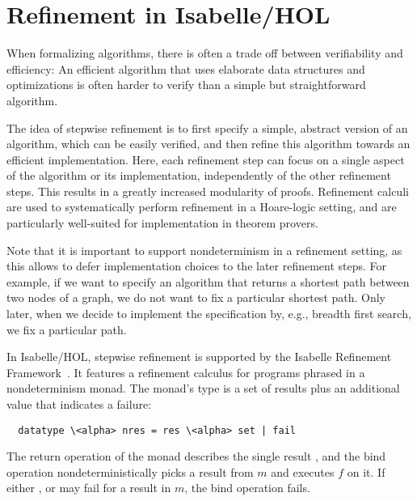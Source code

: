 \documentclass{llncs}
\begin{document}
\section{Refinement in Isabelle/HOL}
When formalizing algorithms, there is often a trade off between verifiability 
and efficiency: An efficient algorithm that uses elaborate data structures and optimizations is often harder to 
verify than a simple but straightforward algorithm. 

The idea of stepwise refinement \cite{Wirth} is to first specify a simple, abstract version of an algorithm, which can be easily verified,
and then refine this algorithm towards an efficient implementation. Here, each refinement step can focus on a single aspect of the algorithm or 
its implementation, independently of the other refinement steps. This results in a greatly increased modularity of proofs. 
Refinement calculi \cite{Back} are used to systematically perform refinement in a Hoare-logic setting, and are particularly well-suited for 
implementation in theorem provers. 

Note that it is important to support nondeterminism in a refinement setting, as this allows to defer 
implementation choices to the later refinement steps. For example, if we want to specify an algorithm 
that returns a shortest path between two nodes of a graph, we do not want to fix a particular shortest path.
Only later, when we decide to implement the specification by, e.g., breadth first search, we fix a particular path.

In Isabelle/HOL, stepwise refinement is supported by the Isabelle Refinement Framework~\cite{LaTu12}. 
It features a refinement calculus for programs phrased in a nondeterminism monad. 
The monad's type is a set of results plus an additional value that indicates a failure:
\begin{lstlisting}
  datatype \<alpha> nres = res \<alpha> set | fail
\end{lstlisting}
The return operation  of the monad describes the single result , and the bind 
operation  nondeterministically picks a result from $m$ and executes $f$ on it. 
If either , or  may fail for a result in $m$, the bind operation fails.
\end{document}
